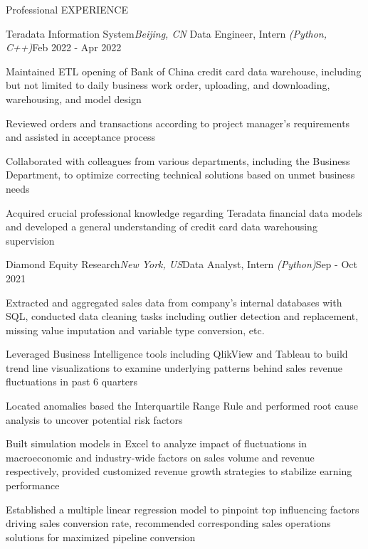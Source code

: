 \documentclass{resume} %
\begin{document}
\begin{rSection}{Professional EXPERIENCE}
	
	\begin{rSubsection}{Teradata Information System}{\em Beijing, CN}
		{Data Engineer, Intern \emph{(Python, C++)}}{Feb 2022 - Apr 2022}

		\item Maintained ETL opening of Bank of China credit card data warehouse, including but not limited to daily business work order, uploading, and downloading, warehousing, and model design
		\item Reviewed orders and transactions according to project manager's requirements and assisted in acceptance process
		\item Collaborated with colleagues from various departments, including the Business Department, to optimize correcting technical solutions based on unmet business needs
		\item Acquired crucial professional knowledge regarding Teradata financial data models and developed a general understanding of credit card data warehousing supervision
		\vspace{-0.3em}
	\end{rSubsection}
	
	\begin{rSubsection}{Diamond Equity Research}{\em New York, US}{Data Analyst, Intern \emph{(Python)}}{Sep - Oct 2021}
		
	\item Extracted and aggregated sales data from company's internal databases with SQL, conducted data cleaning tasks including outlier detection and replacement, missing value imputation and variable type conversion, etc.
	\item Leveraged Business Intelligence tools including QlikView and Tableau to build trend line visualizations to examine underlying patterns behind sales revenue fluctuations in past 6 quarters
	\item Located anomalies based the Interquartile Range Rule and performed root cause analysis to uncover potential risk factors
	\item Built simulation models in Excel to analyze impact of fluctuations in macroeconomic and industry-wide factors on sales volume and revenue respectively, provided customized revenue growth strategies to stabilize earning performance
	\item Established a multiple linear regression model to pinpoint top influencing factors driving sales conversion rate, recommended corresponding sales operations solutions for maximized pipeline conversion
	\end{rSubsection}
	
	
\end{rSection}
	
\end{document}
